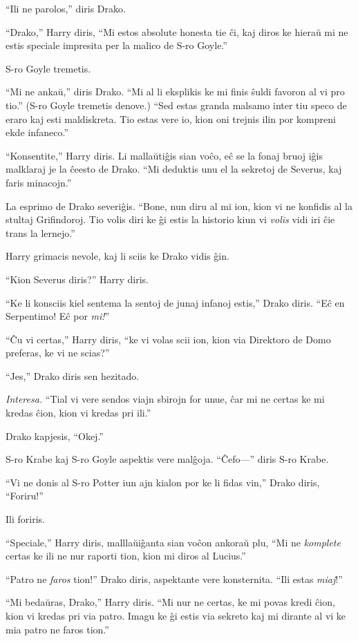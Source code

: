 ``Ili ne parolos,'' diris Drako.

``Drako,'' Harry diris, ``Mi estos absolute honesta tie ĉi, kaj diros
ke hieraŭ mi ne estis speciale impresita per la malico de S-ro Goyle.''

S-ro Goyle tremetis.

``Mi ne ankaŭ,'' diris Drako. ``Mi al li eksplikis ke mi finis ŝuldi
favoron al vi pro tio.'' (S-ro Goyle tremetis denove.) ``Sed estas
granda malsamo inter tiu speco de eraro kaj esti maldiskreta. Tio
estas vere io, kion oni trejnis ilin por kompreni ekde infaneco.''

``Konsentite,'' Harry diris. Li mallaŭtiĝis sian voĉo, eĉ se la fonaj
bruoj iĝis malklaraj je la ĉeesto de Drako. ``Mi deduktis unu el la
sekretoj de Severus, kaj faris minacojn.''

La esprimo de Drako severiĝis. ``Bone, nun diru al mi ion, kion vi ne
konfidis al la stultaj Grifindoroj. Tio volis diri ke ĝi estis la
historio kiun vi \emph{volis} vidi iri ĉie trans la lernejo.''

Harry grimacis nevole, kaj li sciis ke Drako vidis ĝin.

``Kion Severus diris?'' Harry diris.

``Ke li konsciis kiel sentema la sentoj de junaj infanoj estis,''
Drako diris. ``Eĉ en Serpentimo! Eĉ por \emph{mi!}''

``Ĉu vi certas,'' Harry diris, ``ke vi volas scii ion, kion via
Direktoro de Domo preferas, ke vi ne scias?''

``Jes,'' Drako diris sen hezitado.

\emph{Interesa.} ``Tial vi vere sendos viajn sbirojn for unue, ĉar mi
ne certas ke mi kredas ĉion, kion vi kredas pri ili.''

Drako kapjesis, ``Okej.''

S-ro Krabe kaj S-ro Goyle aspektis vere malĝoja. ``Ĉefo—'' diris S-ro Krabe.

``Vi ne donis al S-ro Potter iun ajn kialon por ke li fidas vin,'' Drako diris, ``Foriru!''

Ili foriris.

``Speciale,'' Harry diris, malllaŭiĝanta sian voĉon ankoraŭ plu, ``Mi
ne \emph{komplete} certas ke ili ne nur raporti tion, kion mi diros al
Lucius.''

``Patro ne \emph{faros} tion!'' Drako diris, aspektante vere
konsternita. ``Ili estas \emph{miaj}!''

``Mi bedaŭras, Drako,'' Harry diris. ``Mi nur ne certas, ke mi povas
kredi ĉion, kion vi kredas pri via patro. Imagu ke ĝi estis via
sekreto kaj mi dirante al vi ke mia patro ne faros tion.''


